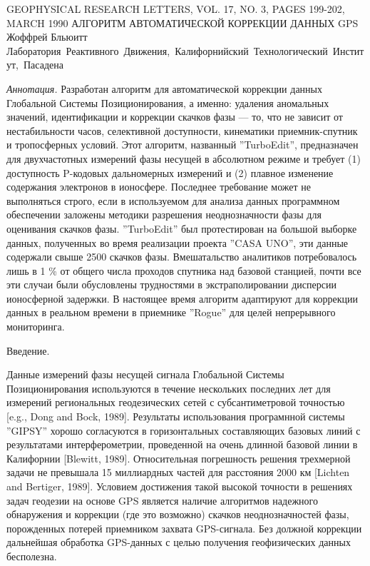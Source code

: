 \documentclass[12pt,a4paper]{article}
\begin{document}
\sloppy

\begin{center}
GEOPHYSICAL RESEARCH LETTERS, VOL. 17, NO. 3, PAGES 199-202, MARCH 1990
\bigbreak
АЛГОРИТМ АВТОМАТИЧЕСКОЙ КОРРЕКЦИИ ДАННЫХ GPS
\medbreak
Жоффрей Бльюитт
\medbreak
\mbox{Лаборатория Реактивного Движения, Калифорнийский Технологический Институт, Пасадена}
\end{center}

\emph{Аннотация.} Разработан алгоритм для автоматической коррекции данных
Глобальной Системы Позиционирования, а именно: удаления аномальных значений, 
идентификации и коррекции скачков фазы --- то, что не зависит от нестабильности
часов, селективной доступности, кинематики приемник-спутник и тропосферных
условий. Этот алгоритм, названный ''TurboEdit'', предназначен для двухчастотных
измерений фазы несущей в абсолютном режиме и требует (1) доступность P-кодовых 
дальномерных измерений и (2) плавное изменение содержания электронов в 
ионосфере. Последнее требование может не выполняться строго, если в 
используемом для анализа данных программном обеспечении заложены методики 
разрешения неоднозначности фазы для оценивания скачков фазы. ''TurboEdit''
был протестирован на большой выборке данных, полученных во время реализации
проекта ''CASA UNO'', эти данные содержали свыше 2500 скачков фазы.
Вмешатальство аналитиков потребовалось лишь в 1 \% от общего числа проходов
спутника над базовой станцией, почти все эти случаи были обусловлены
трудностями в экстраполировании дисперсии ионосферной задержки. В настоящее
время алгоритм адаптируют для коррекции данных в реальном времени в приемнике
''Rogue'' для целей непрерывного мониторинга.

\medbreak
\begin{center}
	Введение. 
\end{center}

\medbreak
Данные измерений фазы несущей сигнала Глобальной Системы Позиционирования
используются в течение нескольких последних лет для измерений региональных
геодезических сетей с субсантиметровой точностью [e.g., Dong and Bock, 1989]. 
Результаты использования програмнной системы ''GIPSY'' хорошо согласуются в 
горизонтальных составляющих базовых линий с результатами интерферометрии, 
проведенной на очень длинной базовой линии в Калифорнии [Blewitt, 1989].
Относительная погрешность решения трехмерной задачи не превышала 15 миллиардных
частей для расстояния 2000 км [Lichten and Bertiger, 1989]. Условием достижения
такой высокой точности в решениях задач геодезии на основе GPS является наличие
алгоритмов надежного обнаружения и коррекции (где это возможно) скачков 
неоднозначностей фазы,
порожденных потерей приемником захвата GPS-сигнала. Без должной коррекции
дальнейшая обработка GPS-данных с целью получения геофизических данных
бесполезна.
\end{document}
